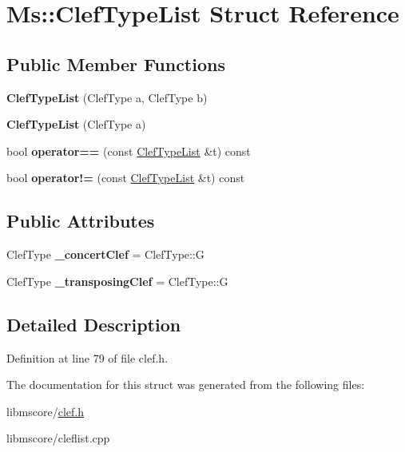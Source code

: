 \hypertarget{struct_ms_1_1_clef_type_list}{}\section{Ms\+:\+:Clef\+Type\+List Struct Reference}
\label{struct_ms_1_1_clef_type_list}
\subsection*{Public Member Functions}
\begin{DoxyCompactItemize}
\item 
\mbox{\label{struct_ms_1_1_clef_type_list_a2ce99fb65829a940a829c413421bafe4}} 
{\bfseries Clef\+Type\+List} (Clef\+Type a, Clef\+Type b)
\item 
\mbox{\label{struct_ms_1_1_clef_type_list_a135688157be2f8b45d60c3422176461f}} 
{\bfseries Clef\+Type\+List} (Clef\+Type a)
\item 
\mbox{\label{struct_ms_1_1_clef_type_list_af4188419e9a35e9b8d032af8a2b09ca2}} 
bool {\bfseries operator==} (const \hyperlink{struct_ms_1_1_clef_type_list}{Clef\+Type\+List} \&t) const
\item 
\mbox{\label{struct_ms_1_1_clef_type_list_adcd01c42970af7f7665b5d687108b999}} 
bool {\bfseries operator!=} (const \hyperlink{struct_ms_1_1_clef_type_list}{Clef\+Type\+List} \&t) const
\end{DoxyCompactItemize}
\subsection*{Public Attributes}
\begin{DoxyCompactItemize}
\item 
\mbox{\label{struct_ms_1_1_clef_type_list_a439d1af8fbc56d3f1233a94fae255117}} 
Clef\+Type {\bfseries \+\_\+concert\+Clef} = Clef\+Type\+::G
\item 
\mbox{\label{struct_ms_1_1_clef_type_list_aefa541c00c4453cc0f17e98b949e00cb}} 
Clef\+Type {\bfseries \+\_\+transposing\+Clef} = Clef\+Type\+::G
\end{DoxyCompactItemize}


\subsection{Detailed Description}


Definition at line 79 of file clef.\+h.



The documentation for this struct was generated from the following files\+:\begin{DoxyCompactItemize}
\item 
libmscore/\hyperlink{clef_8h}{clef.\+h}\item 
libmscore/cleflist.\+cpp\end{DoxyCompactItemize}

